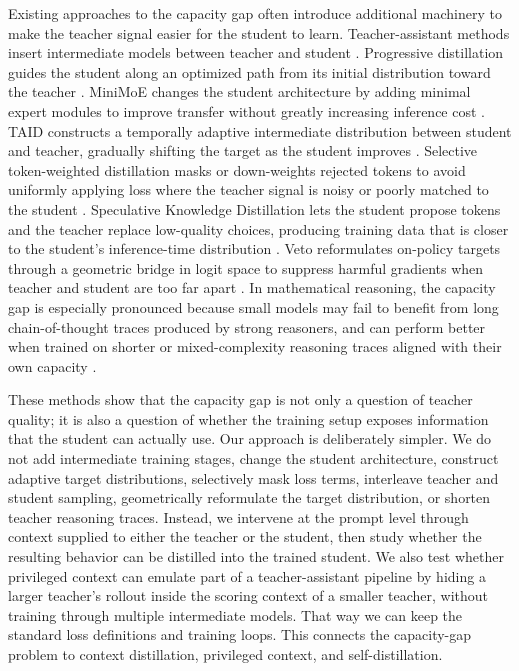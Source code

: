 Existing approaches to the capacity gap often introduce additional machinery to make the teacher signal easier for the student to learn. Teacher-assistant methods insert intermediate models between teacher and student \cite{mirzadehImprovedKnowledgeDistillation2019}. Progressive distillation guides the student along an optimized path from its initial distribution toward the teacher \cite{shi2021FollowYourPath}. MiniMoE changes the student architecture by adding minimal expert modules to improve transfer without greatly increasing inference cost \cite{zhangLiftingCurseCapacity2023}. TAID constructs a temporally adaptive intermediate distribution between student and teacher, gradually shifting the target as the student improves \cite{shingTAIDTemporallyAdaptive2025}. Selective token-weighted distillation masks or down-weights rejected tokens to avoid uniformly applying loss where the teacher signal is noisy or poorly matched to the student \cite{huang2025SelecTKDSelectiveTokenWeighted}. Speculative Knowledge Distillation lets the student propose tokens and the teacher replace low-quality choices, producing training data that is closer to the student's inference-time distribution \cite{xu2024SpeculativeKnowledgeDistillation}. Veto reformulates on-policy targets through a geometric bridge in logit space to suppress harmful gradients when teacher and student are too far apart \cite{jang2026StableOnPolicyDistillation}. In mathematical reasoning, the capacity gap is especially pronounced because small models may fail to benefit from long chain-of-thought traces produced by strong reasoners, and can perform better when trained on shorter or mixed-complexity reasoning traces aligned with their own capacity \cite{liSmallModelsStruggle2025}.

These methods show that the capacity gap is not only a question of teacher quality; it is also a question of whether the training setup exposes information that the student can actually use. Our approach is deliberately simpler. We do not add intermediate training stages, change the student architecture, construct adaptive target distributions, selectively mask loss terms, interleave teacher and student sampling, geometrically reformulate the target distribution, or shorten teacher reasoning traces. Instead, we intervene at the prompt level through context supplied to either the teacher or the student, then study whether the resulting behavior can be distilled into the trained student. We also test whether privileged context can emulate part of a teacher-assistant pipeline by hiding a larger teacher's rollout inside the scoring context of a smaller teacher, without training through multiple intermediate models. That way we can keep the standard loss definitions and training loops. This connects the capacity-gap problem to context distillation, privileged context, and self-distillation.

